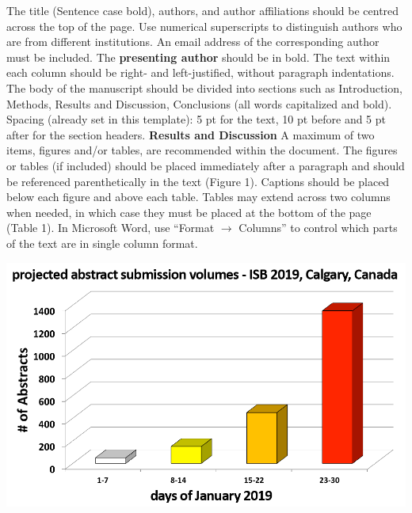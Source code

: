 \documentclass[10pt]{article}
\newenvironment{Figure}
  {\par\medskip\noindent\minipage{\linewidth}}
  {\endminipage\par\medskip}
\begin{document}
\begin{multicols}{2}
The title (Sentence case bold), authors, and author affiliations should be centred across the top of the page. Use numerical superscripts to distinguish authors who are from different institutions. An email address of the corresponding author must be included. The \textbf{presenting author} should be in bold. \vspace{5pt} \newline
The text within each column should be right- and left-justified, without paragraph indentations. The body of the manuscript should be divided into sections such as Introduction, Methods, Results and Discussion, Conclusions (all words capitalized and bold). Spacing (already set in this template): 5 pt for the text, 10 pt before and 5 pt after for the section headers. \vspace{10pt} \newline
\textbf{Results and Discussion} \vspace{5pt} \newline
A maximum of two items, figures and/or tables, are recommended within the document. The figures or tables (if included) should be placed immediately after a paragraph and should be referenced parenthetically in the text (Figure 1). Captions should be placed below each figure and above each table. Tables may extend across two columns when needed, in which case they must be placed at the bottom of the page (Table 1). In Microsoft Word, use “Format $\rightarrow$ Columns” to control which parts of the text are in single column format.
\begin{Figure}
    \centering
    \includegraphics[width=\linewidth]{isb}
\end{Figure}


\end{multicols}
\end{document}
